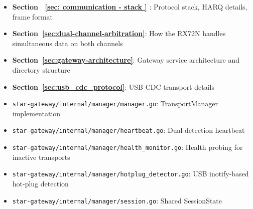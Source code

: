 \begin{itemize}[leftmargin = 1.5em, topsep = 4pt, itemsep = 2pt]
    \item \textbf{Section ~\ref{sec:
communication - stack
}
}: Protocol stack, HARQ details, frame format
    \item \textbf{Section~\ref{sec:dual-channel-arbitration}}: How the RX72N handles simultaneous data on both channels
    \item \textbf{Section~\ref{sec:gateway-architecture}}: Gateway service architecture and directory structure
    \item \textbf{Section~\ref{sec:usb_cdc_protocol}}: USB CDC transport details
    \item \texttt{star-gateway/internal/manager/manager.go}: TransportManager implementation
    \item \texttt{star-gateway/internal/manager/heartbeat.go}: Dual-detection heartbeat
    \item \texttt{star-gateway/internal/manager/health\_monitor.go}: Health probing for inactive transports
    \item \texttt{star-gateway/internal/manager/hotplug\_detector.go}: USB inotify-based hot-plug detection
    \item \texttt{star-gateway/internal/manager/session.go}: Shared SessionState
\end{itemize}
